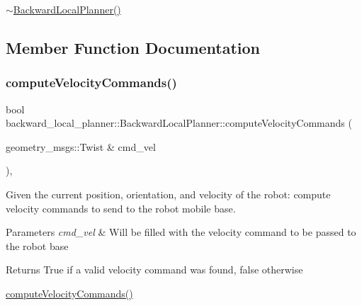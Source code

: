 \hyperlink{classbackward__local__planner_1_1BackwardLocalPlanner_aab1430f79670f07bf21d0b796539f3e8}{$\sim$\+Backward\+Local\+Planner()} 

\subsection{Member Function Documentation}
\mbox{\label{classbackward__local__planner_1_1BackwardLocalPlanner_ad7145b72592b48a21631befcdfbd14f0}} 
\subsubsection{\texorpdfstring{compute\+Velocity\+Commands()}{computeVelocityCommands()}}
{\footnotesize\ttfamily bool backward\+\_\+local\+\_\+planner\+::\+Backward\+Local\+Planner\+::compute\+Velocity\+Commands (\begin{DoxyParamCaption}\item[{geometry\+\_\+msgs\+::\+Twist \&}]{cmd\+\_\+vel }\end{DoxyParamCaption})\hspace{0.3cm}{\ttfamily [override]}, {\ttfamily [virtual]}}



Given the current position, orientation, and velocity of the robot\+: compute velocity commands to send to the robot mobile base. 


\begin{DoxyParams}{Parameters}
{\em cmd\+\_\+vel} & Will be filled with the velocity command to be passed to the robot base \\
\hline
\end{DoxyParams}
\begin{DoxyReturn}{Returns}
True if a valid velocity command was found, false otherwise
\end{DoxyReturn}
\hyperlink{classbackward__local__planner_1_1BackwardLocalPlanner_ad7145b72592b48a21631befcdfbd14f0}{compute\+Velocity\+Commands()} \mbox{\label{classbackward__local__planner_1_1BackwardLocalPlanner_a2892c597ff24b2b11993011f52df1570}} 
